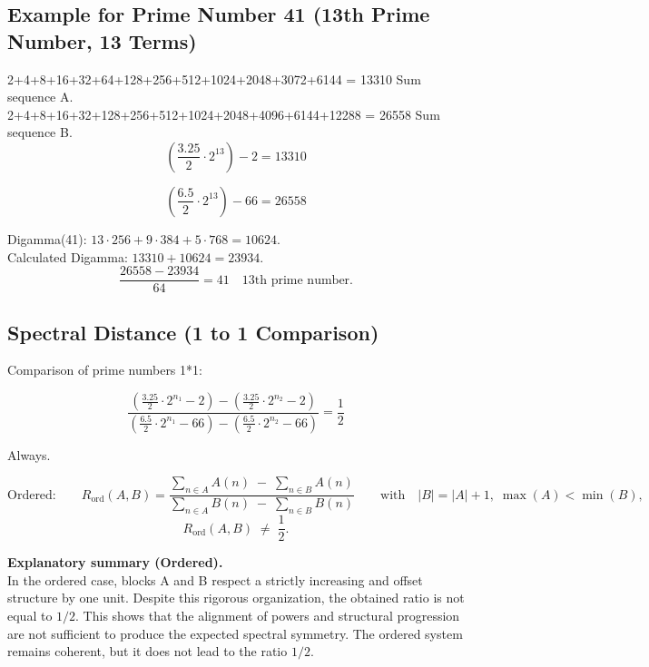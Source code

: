 \documentclass[a4paper,11pt]{article}
\begin{document}
\bigskip

\subsection*{Example for Prime Number 41 (13th Prime Number, 13 Terms)}

2+4+8+16+32+64+128+256+512+1024+2048+3072+6144 = 13310 Sum sequence A.\\
2+4+8+16+32+128+256+512+1024+2048+4096+6144+12288 = 26558 Sum sequence B.\\

\[
\left(\frac{3.25}{2} \cdot 2^{13}\right) - 2 = 13310
\]

\[
\left(\frac{6.5}{2} \cdot 2^{13}\right) - 66 = 26558
\]

Digamma(41): \(13 \cdot 256 + 9 \cdot 384 + 5 \cdot 768 = 10624\).\\
Calculated Digamma: \(13310 + 10624 = 23934\).\\

\[
\frac{26558 - 23934}{64} = 41 \quad \text{13th prime number.}
\]

\bigskip

\subsection*{Spectral Distance (1 to 1 Comparison)}

Comparison of prime numbers 1*1:

\[
\frac{
\left(\frac{3.25}{2} \cdot 2^{n_{1}} - 2\right)
-
\left(\frac{3.25}{2} \cdot 2^{n_{2}} - 2\right)
}{
\left(\frac{6.5}{2} \cdot 2^{n_{1}} - 66\right)
-
\left(\frac{6.5}{2} \cdot 2^{n_{2}} - 66\right)
}
= \frac{1}{2}
\]

Always.

\[
\text{Ordered:}\qquad
R_{\mathrm{ord}}(A,B)
=
\frac{\displaystyle \sum_{n \in A} A(n)\;-\;\sum_{n \in B} A(n)}
     {\displaystyle \sum_{n \in A} B(n)\;-\;\sum_{n \in B} B(n)}
\qquad\text{with}\quad |B| = |A| + 1,\; \max(A) < \min(B),
\]
\[
R_{\mathrm{ord}}(A,B) \;\neq\; \frac{1}{2}.
\]

\textbf{Explanatory summary (Ordered).} \\
In the ordered case, blocks A and B respect a strictly increasing
and offset structure by one unit. Despite this rigorous organization, the obtained ratio is
not equal to $1/2$. This shows that the alignment of powers and structural progression
are not sufficient to produce the expected spectral symmetry. The ordered system
remains coherent, but it does not lead to the ratio $1/2$.
\end{document}
